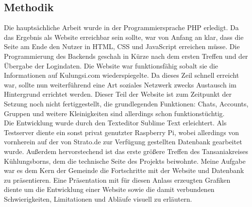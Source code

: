 \subsection{Methodik} %
Die hauptsächliche Arbeit wurde in der Programmiersprache PHP erledigt.
Da das Ergebnis als Website erreichbar sein sollte,
war von Anfang an klar, dass die Seite am Ende den Nutzer in HTML, CSS und JavaScript
erreichen müsse.
Die Programmierung des Backends geschah in Kürze nach dem ersten Treffen und der Übergabe der Logindaten.
Die Website war funktionsfähig sobalt sie die Informationen auf Kulungsi.com wiederspiegelte.
Da dieses Zeil schnell erreicht war, sollte nun weiterführend eine Art soziales Netzwerk zwecks Austausch im Hintergrund errichtet werden.
Dieser Teil der Website ist zum Zeitpunkt der Setzung noch nicht fertiggestellt, die grundlegenden
Funktionen: Chats, Accounts, Gruppen und weitere Kleinigkeiten sind allerdings schon funktionstüchtig.\\
Die Entwicklung wurde durch den Texteditor Sublime Text erleichtert.
Als Testserver diente ein sonst privat genutzter Raspberry Pi,
wobei allerdings von vornherein auf der von Strato.de zur Verfügung gestellten Datenbank gearbeitet wurde.
Außerdem hervorstechend ist das erste größere Treffen des Tansaniakreises Kühlungsborns,
dem die technische Seite des Projekts beiwohnte.
Meine Aufgabe war es dem Kern der Gemeinde die Fortschritte mit der Website und Datenbank zu präsentieren.
Eine Präsentation mit für diesen Anlass erzeugten Grafiken diente um die Entwicklung einer Website
sowie die damit verbundenen Schwierigkeiten, Limitationen und Abläufe visuell zu erläutern.

